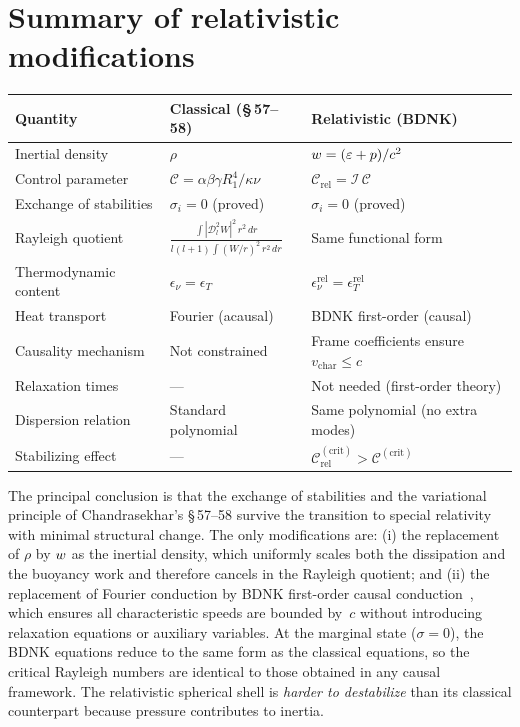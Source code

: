 \section{Summary of relativistic modifications}
\label{sec:rel-57-58-summary}

\begin{center}
\renewcommand{\arraystretch}{1.3}
\begin{tabular}{p{5.2cm}p{4.5cm}p{4.5cm}}
\hline
\textbf{Quantity} & \textbf{Classical (\S\,57--58)}
  & \textbf{Relativistic (BDNK)} \\
\hline
Inertial density
  & $\rho$
  & $w = (\varepsilon + p)/c^{2}$ \\
Control parameter
  & $\mathcal{C} = \alpha\beta\gamma R_{1}^{4}/\kappa\nu$
  & $\mathcal{C}_{\mathrm{rel}} = \mathcal{I}\,\mathcal{C}$ \\
Exchange of stabilities
  & $\sigma_{i} = 0$ (proved)
  & $\sigma_{i} = 0$ (proved) \\
Rayleigh quotient
  & $\displaystyle\frac{\int|\mathscr{D}_{l}^{2}W|^{2}\,r^{2}\,dr}
      {l(l+1)\int(W/r)^{2}\,r^{2}\,dr}$
  & Same functional form \\
Thermodynamic content
  & $\epsilon_{\nu} = \epsilon_{T}$
  & $\epsilon_{\nu}^{\mathrm{rel}} = \epsilon_{T}^{\mathrm{rel}}$ \\
Heat transport
  & Fourier (acausal)
  & BDNK first-order (causal) \\
Causality mechanism
  & Not constrained
  & Frame coefficients ensure
    $v_{\mathrm{char}} \leq c$ \\
Relaxation times
  & ---
  & Not needed (first-order theory) \\
Dispersion relation
  & Standard polynomial
  & Same polynomial (no extra modes) \\
Stabilizing effect
  & ---
  & $\mathcal{C}_{\mathrm{rel}}^{(\mathrm{crit})}
      > \mathcal{C}^{(\mathrm{crit})}$ \\
\hline
\end{tabular}
\end{center}

The principal conclusion is that the exchange of stabilities and the
variational principle of Chandrasekhar's \S\,57--58 survive the
transition to special relativity with minimal structural change.  The
only modifications are: (i) the replacement of $\rho$ by $w$
as the inertial density, which uniformly scales both the dissipation
and the buoyancy work and therefore cancels in the Rayleigh quotient;
and (ii) the replacement of Fourier conduction by BDNK first-order
causal conduction~\cite{BemficaDN2018,Kovtun2019}, which ensures all
characteristic speeds are bounded by~$c$ without introducing
relaxation equations or auxiliary variables.  At the marginal state
($\sigma = 0$), the BDNK equations reduce to the same form as the
classical equations, so the critical Rayleigh numbers are identical
to those obtained in any causal framework.  The relativistic
spherical shell is \emph{harder to destabilize} than its classical
counterpart because pressure contributes to inertia.


